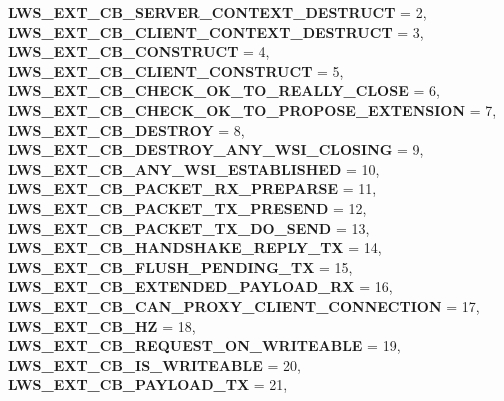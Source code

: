 \begin{DoxyCompactItemize}
\newline
{\bfseries L\+W\+S\+\_\+\+E\+X\+T\+\_\+\+C\+B\+\_\+\+S\+E\+R\+V\+E\+R\+\_\+\+C\+O\+N\+T\+E\+X\+T\+\_\+\+D\+E\+S\+T\+R\+U\+CT} = 2, 
{\bfseries L\+W\+S\+\_\+\+E\+X\+T\+\_\+\+C\+B\+\_\+\+C\+L\+I\+E\+N\+T\+\_\+\+C\+O\+N\+T\+E\+X\+T\+\_\+\+D\+E\+S\+T\+R\+U\+CT} = 3, 
{\bfseries L\+W\+S\+\_\+\+E\+X\+T\+\_\+\+C\+B\+\_\+\+C\+O\+N\+S\+T\+R\+U\+CT} = 4, 
{\bfseries L\+W\+S\+\_\+\+E\+X\+T\+\_\+\+C\+B\+\_\+\+C\+L\+I\+E\+N\+T\+\_\+\+C\+O\+N\+S\+T\+R\+U\+CT} = 5, 
\newline
{\bfseries L\+W\+S\+\_\+\+E\+X\+T\+\_\+\+C\+B\+\_\+\+C\+H\+E\+C\+K\+\_\+\+O\+K\+\_\+\+T\+O\+\_\+\+R\+E\+A\+L\+L\+Y\+\_\+\+C\+L\+O\+SE} = 6, 
{\bfseries L\+W\+S\+\_\+\+E\+X\+T\+\_\+\+C\+B\+\_\+\+C\+H\+E\+C\+K\+\_\+\+O\+K\+\_\+\+T\+O\+\_\+\+P\+R\+O\+P\+O\+S\+E\+\_\+\+E\+X\+T\+E\+N\+S\+I\+ON} = 7, 
{\bfseries L\+W\+S\+\_\+\+E\+X\+T\+\_\+\+C\+B\+\_\+\+D\+E\+S\+T\+R\+OY} = 8, 
{\bfseries L\+W\+S\+\_\+\+E\+X\+T\+\_\+\+C\+B\+\_\+\+D\+E\+S\+T\+R\+O\+Y\+\_\+\+A\+N\+Y\+\_\+\+W\+S\+I\+\_\+\+C\+L\+O\+S\+I\+NG} = 9, 
\newline
{\bfseries L\+W\+S\+\_\+\+E\+X\+T\+\_\+\+C\+B\+\_\+\+A\+N\+Y\+\_\+\+W\+S\+I\+\_\+\+E\+S\+T\+A\+B\+L\+I\+S\+H\+ED} = 10, 
{\bfseries L\+W\+S\+\_\+\+E\+X\+T\+\_\+\+C\+B\+\_\+\+P\+A\+C\+K\+E\+T\+\_\+\+R\+X\+\_\+\+P\+R\+E\+P\+A\+R\+SE} = 11, 
{\bfseries L\+W\+S\+\_\+\+E\+X\+T\+\_\+\+C\+B\+\_\+\+P\+A\+C\+K\+E\+T\+\_\+\+T\+X\+\_\+\+P\+R\+E\+S\+E\+ND} = 12, 
{\bfseries L\+W\+S\+\_\+\+E\+X\+T\+\_\+\+C\+B\+\_\+\+P\+A\+C\+K\+E\+T\+\_\+\+T\+X\+\_\+\+D\+O\+\_\+\+S\+E\+ND} = 13, 
\newline
{\bfseries L\+W\+S\+\_\+\+E\+X\+T\+\_\+\+C\+B\+\_\+\+H\+A\+N\+D\+S\+H\+A\+K\+E\+\_\+\+R\+E\+P\+L\+Y\+\_\+\+TX} = 14, 
{\bfseries L\+W\+S\+\_\+\+E\+X\+T\+\_\+\+C\+B\+\_\+\+F\+L\+U\+S\+H\+\_\+\+P\+E\+N\+D\+I\+N\+G\+\_\+\+TX} = 15, 
{\bfseries L\+W\+S\+\_\+\+E\+X\+T\+\_\+\+C\+B\+\_\+\+E\+X\+T\+E\+N\+D\+E\+D\+\_\+\+P\+A\+Y\+L\+O\+A\+D\+\_\+\+RX} = 16, 
{\bfseries L\+W\+S\+\_\+\+E\+X\+T\+\_\+\+C\+B\+\_\+\+C\+A\+N\+\_\+\+P\+R\+O\+X\+Y\+\_\+\+C\+L\+I\+E\+N\+T\+\_\+\+C\+O\+N\+N\+E\+C\+T\+I\+ON} = 17, 
\newline
{\bfseries L\+W\+S\+\_\+\+E\+X\+T\+\_\+\+C\+B\+\_\+HZ} = 18, 
{\bfseries L\+W\+S\+\_\+\+E\+X\+T\+\_\+\+C\+B\+\_\+\+R\+E\+Q\+U\+E\+S\+T\+\_\+\+O\+N\+\_\+\+W\+R\+I\+T\+E\+A\+B\+LE} = 19, 
{\bfseries L\+W\+S\+\_\+\+E\+X\+T\+\_\+\+C\+B\+\_\+\+I\+S\+\_\+\+W\+R\+I\+T\+E\+A\+B\+LE} = 20, 
{\bfseries L\+W\+S\+\_\+\+E\+X\+T\+\_\+\+C\+B\+\_\+\+P\+A\+Y\+L\+O\+A\+D\+\_\+\+TX} = 21, 
\newline

\end{DoxyCompactItemize}
